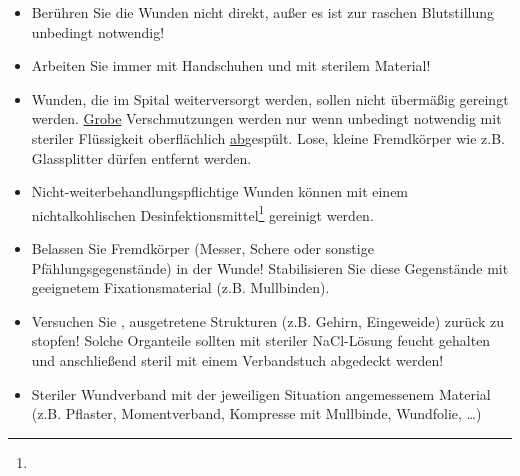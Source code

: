 \begin{itemize}
    \item Berühren Sie die Wunden nicht direkt, außer es ist
    zur raschen Blutstillung unbedingt notwendig!
    \item Arbeiten Sie immer mit Handschuhen und mit sterilem Material!
    \item Wunden, die im Spital weiterversorgt werden, sollen
    nicht übermäßig gereingt werden. \underline{Grobe}
    Verschmutzungen werden nur wenn unbedingt notwendig mit
    steriler Flüssigkeit  oberflächlich \underline{ab}gespült. Lose, kleine
    Fremdkörper wie z.B. Glassplitter dürfen entfernt werden.
    \item Nicht-weiterbehandlungspflichtige Wunden können
    mit einem nichtalkohlischen
    Desinfektionsmittel\footnote{} gereinigt werden.
    \item Belassen Sie Fremdkörper (Messer, Schere oder sonstige Pfählungsgegenstände) in der Wunde! Stabilisieren Sie diese Gegenstände mit geeignetem Fixationsmaterial (z.B. Mullbinden).
    \item Versuchen Sie , ausgetretene Strukturen
    (z.B. Gehirn, Eingeweide) zurück zu stopfen! Solche Organteile sollten mit steriler NaCl-Lösung feucht gehalten und anschließend steril mit einem Verbandstuch abgedeckt werden!
    \item Steriler Wundverband mit der jeweiligen Situation
    angemessenem Material (z.B. Pflaster, Momentverband,
    Kompresse mit Mullbinde, Wundfolie, \ldots)
\end{itemize}

